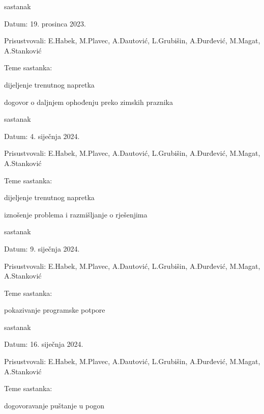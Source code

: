 \begin{packed_enum}
			\item  sastanak
			\item[] \begin{packed_item}
				\item Datum: 19. prosinca 2023.
				\item Prisustvovali: E.Habek, M.Plavec, A.Dautović, L.Grubišin, A.Đurđević, M.Magat, A.Stanković
				\item Teme sastanka:
				\begin{packed_item}
					\item dijeljenje trenutnog napretka
					\item dogovor o daljnjem ophođenju preko zimskih praznika
				\end{packed_item}
			\end{packed_item}

			\item  sastanak
			\item[] \begin{packed_item}
				\item Datum: 4. siječnja 2024.
				\item Prisustvovali: E.Habek, M.Plavec, A.Dautović, L.Grubišin, A.Đurđević, M.Magat, A.Stanković
				\item Teme sastanka:
				\begin{packed_item}
					\item dijeljenje trenutnog napretka
					\item iznošenje problema i razmišljanje o rješenjima
				\end{packed_item}
			\end{packed_item}

			\item  sastanak
			\item[] \begin{packed_item}
				\item Datum: 9. siječnja 2024.
				\item Prisustvovali: E.Habek, M.Plavec, A.Dautović, L.Grubišin, A.Đurđević, M.Magat, A.Stanković
				\item Teme sastanka:
				\begin{packed_item}
					\item pokazivanje programske potpore
				\end{packed_item}
			\end{packed_item}

			\item  sastanak
			\item[] \begin{packed_item}
				\item Datum: 16. siječnja 2024.
				\item Prisustvovali: E.Habek, M.Plavec, A.Dautović, L.Grubišin, A.Đurđević, M.Magat, A.Stanković
				\item Teme sastanka:
				\begin{packed_item}
					\item dogovoravanje puštanje u pogon
				\end{packed_item}
			\end{packed_item}
			
		\end{packed_enum}
		

